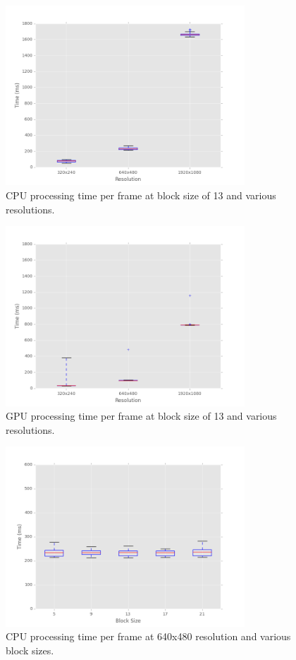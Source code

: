 \documentclass[12pt,letterpaper]{article}
\begin{document}
\begin{figure}[H]
  \centering
    \includegraphics[width=0.8\textwidth]{img/cpu_resolution.png}
  \caption{CPU processing time per frame at block size of 13 and various resolutions.}
  \label{fig:cpures}
\end{figure}

\begin{figure}[H]
  \centering
    \includegraphics[width=0.8\textwidth]{img/gpu_resolution.png}
  \caption{GPU processing time per frame at block size of 13 and various resolutions.}
  \label{fig:gpures}
\end{figure}

\begin{figure}[H]
  \centering
    \includegraphics[width=0.8\textwidth]{img/cpu_blocksize.png}
  \caption{CPU processing time per frame at 640x480 resolution and various block sizes.}
  \label{fig:cpublock}
\end{figure}
\end{document}
